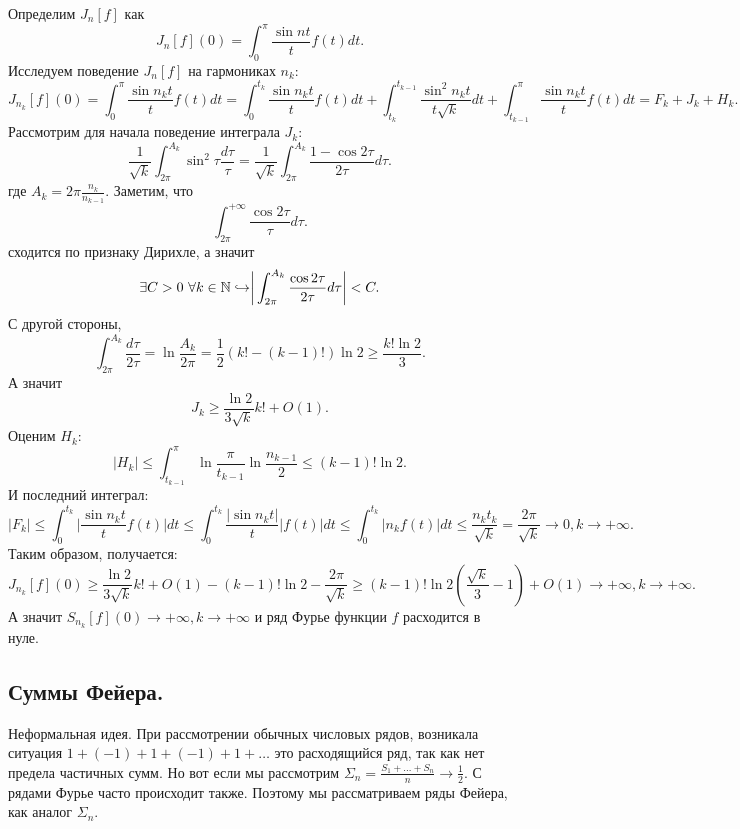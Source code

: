 \begin{example}[Шварц]
    Определим $J_n[f]$ как \[
                                                                                                  J_n[f](0) = \int_0^\pi \dfrac{\sin nt}{t}f(t)dt.
    \]
    Исследуем поведение $J_n[f]$ на гармониках $n_k$:
    \[
        J_{n_k}[f](0) = \int_0^\pi \dfrac{\sin n_kt}{t}f(t)dt = \int_0^{t_k}\dfrac{\sin n_kt }{t}f(t)dt + \int_{t_k}^{t_{k - 1}}\dfrac{\sin^2 n_kt}{t \sqrt{k}}dt + \int_{t_{k - 1}}^\pi \dfrac{\sin n_kt}{t}f(t)dt = F_k + J_k + H_k.
    \]
    Рассмотрим для начала поведение интеграла $J_k$:
    \[
        \dfrac{1}{\sqrt{k}}\int_{2\pi}^{A_k}\sin^2 \tau \dfrac{d\tau}{\tau} = \dfrac{1}{\sqrt{k}}\int_{2\pi}^{A_k}\dfrac{1 - \cos 2\tau}{2\tau}d\tau.
    \]
    где $A_k = 2\pi \frac{n_k}{n_{k - 1}}$. Заметим, что \[
                                                             \int_{2\pi}^{+\infty}\dfrac{\cos 2\tau}{\tau}d\tau.
    \]
    сходится по признаку Дирихле, а значит \[
                                               \exists C > 0 \ \forall k \in \mathbb{N} \hookrightarrow \biggr|\int_{2\pi}^{A_k} \dfrac{\cos 2\tau}{2\tau}d\tau\biggr| < C.
    \]
    С другой стороны, \[
                          \int_{2\pi}^{A_k} \dfrac{d\tau}{2\tau} = \ln \dfrac{A_k}{2\pi} = \dfrac{1}{2}(k! - (k - 1)!)\ln 2 \geq \dfrac{k! \ln 2}{3}.
    \]
    А значит \[
                 J_k \geq \dfrac{\ln 2}{3\sqrt{k}}k! + O(1).
    \]
    Оценим $H_k$: \[
                      |H_k| \leq \int_{t_{k - 1}}^\pi \ln \dfrac{\pi}{t_{k - 1}} \ln \dfrac{n_{k - 1}}{2} \leq (k - 1)!\ln 2.
    \]
    И последний интеграл: \[
                              |F_k| \leq \int_0^{t_k} \biggr|\dfrac{\sin n_kt}{t}f(t)\biggr|dt \leq \int_0^{t_{k}}\dfrac{|\sin n_kt|}{t}|f(t)|dt \leq \int_0^{t_k}|n_kf(t)|dt \leq \dfrac{n_k t_k}{\sqrt{k}} = \dfrac{2\pi}{\sqrt{k}} \rightarrow 0, k \rightarrow +\infty.
    \]
    Таким образом, получается: \[
                                   J_{n_k}[f](0) \geq \dfrac{\ln 2}{3\sqrt{k}}k! + O(1) - (k - 1)!\ln 2 - \dfrac{2\pi }{\sqrt{k}} \geq (k - 1)!\ln 2(\dfrac{\sqrt{k}}{3} - 1) + O(1) \rightarrow +\infty, k \rightarrow +\infty.
    \]
    А значит $S_{n_k}[f](0) \rightarrow +\infty, k \rightarrow +\infty$ и ряд Фурье функции $f$ расходится в нуле.
\end{example}
\subsection{Суммы Фейера.}
Неформальная идея. При рассмотрении обычных числовых рядов, возникала ситуация $1 + (-1) + 1 + (-1) + 1  + \dots$ это расходящийся ряд, так как нет предела частичных сумм. Но вот если мы рассмотрим $\Sigma_n = \frac{S_1 +\dots +S_n}{n} \to \frac{1}{2}$. С рядами Фурье часто происходит также. Поэтому мы рассматриваем ряды Фейера, как аналог $\Sigma_n$.


